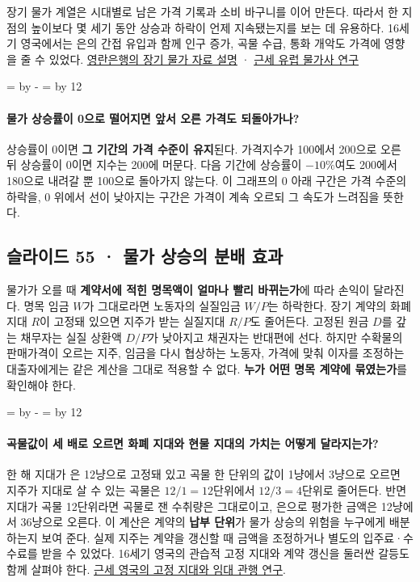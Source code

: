 \documentclass[10pt,a4paper]{article}
\newcommand{\ReserveQuestionSpace}{%
  \par\begingroup
  \dimen0=\pagegoal \advance\dimen0 by -\pagetotal
  \dimen2=\baselineskip \multiply\dimen2 by 12
  \ifdim\dimen0<\dimen2 \newpage\fi
  \endgroup}
\begin{document}
장기 물가 계열은 시대별로 남은 가격 기록과 소비 바구니를 이어 만든다. 따라서 한 지점의 높이보다 몇 세기 동안 상승과 하락이 언제 지속됐는지를 보는 데 유용하다. 16세기 영국에서는 은의 간접 유입과 함께 인구 증가, 곡물 수급, 통화 개악도 가격에 영향을 줄 수 있었다. \href{https://www.bankofengland.co.uk/monetary-policy/inflation/inflation-calculator}{영란은행의 장기 물가 자료 설명} · \href{https://www.cambridge.org/core/books/abs/cambridge-economic-history-of-europe-from-the-decline-of-the-roman-empire/prices-in-europe-from-1450-to-1750/219DB468F29400C2FBA95C1A97CB8E42}{근세 유럽 물가사 연구}\par

\ReserveQuestionSpace
\paragraph{물가 상승률이 0으로 떨어지면 앞서 오른 가격도 되돌아가나?}
상승률이 0이면 \textbf{그 기간의 가격 수준이 유지}된다. 가격지수가 100에서 200으로 오른 뒤 상승률이 0이면 지수는 200에 머문다. 다음 기간에 상승률이 $-10\%$여도 200에서 180으로 내려갈 뿐 100으로 돌아가지 않는다. 이 그래프의 0 아래 구간은 가격 수준의 하락을, 0 위에서 선이 낮아지는 구간은 가격이 계속 오르되 그 속도가 느려짐을 뜻한다.\par

\subsection{슬라이드 55 · 물가 상승의 분배 효과}
물가가 오를 때 \textbf{계약서에 적힌 명목액이 얼마나 빨리 바뀌는가}에 따라 손익이 달라진다. 명목 임금 $W$가 그대로라면 노동자의 실질임금 $W/P$는 하락한다. 장기 계약의 화폐 지대 $R$이 고정돼 있으면 지주가 받는 실질지대 $R/P$도 줄어든다. 고정된 원금 $D$를 갚는 채무자는 실질 상환액 $D/P$가 낮아지고 채권자는 반대편에 선다. 하지만 수확물의 판매가격이 오르는 지주, 임금을 다시 협상하는 노동자, 가격에 맞춰 이자를 조정하는 대출자에게는 같은 계산을 그대로 적용할 수 없다. \textbf{누가 어떤 명목 계약에 묶였는가}를 확인해야 한다.\par

\ReserveQuestionSpace
\paragraph{곡물값이 세 배로 오르면 화폐 지대와 현물 지대의 가치는 어떻게 달라지는가?}
한 해 지대가 은 12냥으로 고정돼 있고 곡물 한 단위의 값이 1냥에서 3냥으로 오르면 지주가 지대로 살 수 있는 곡물은 $12/1=12$단위에서 $12/3=4$단위로 줄어든다. 반면 지대가 곡물 12단위라면 곡물로 잰 수취량은 그대로이고, 은으로 평가한 금액은 12냥에서 36냥으로 오른다. 이 계산은 계약의 \textbf{납부 단위}가 물가 상승의 위험을 누구에게 배분하는지 보여 준다. 실제 지주는 계약을 갱신할 때 금액을 조정하거나 별도의 입주료·수수료를 받을 수 있었다. 16세기 영국의 관습적 고정 지대와 계약 갱신을 둘러싼 갈등도 함께 살펴야 한다. \href{https://www.journals.uchicago.edu/doi/10.1086/728594}{근세 영국의 고정 지대와 임대 관행 연구}.\par
\end{document}
